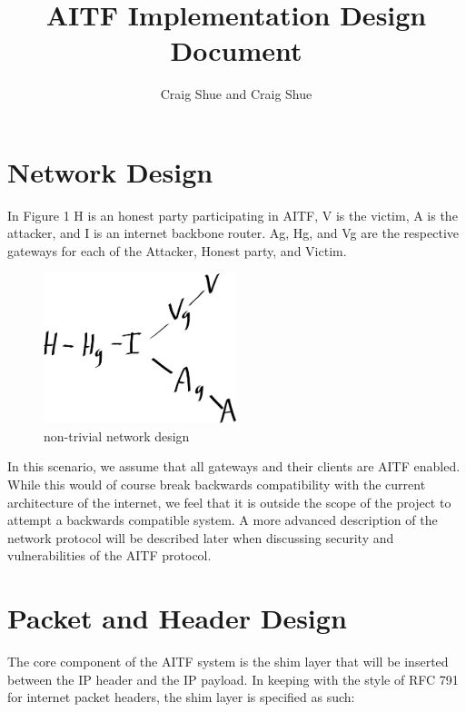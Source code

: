 \documentclass[11pt]{article}
\title{\textbf{AITF Implementation Design Document}}
\author{Craig Shue and Craig Shue}
\date{}
\begin{document}
\maketitle

\section{Network Design}

In Figure 1 H is an honest party participating in AITF, V is the victim, A is
the attacker, and I is an internet backbone router. Ag, Hg, and Vg are the
respective gateways for each of the Attacker, Honest party, and Victim. 
\begin{figure}[h!]
 \caption{non-trivial network design}
 \centering
  \includegraphics[width=0.5\textwidth]{network}
\end{figure}
In this scenario, we assume that all gateways and their clients are AITF
enabled. While this would of course break backwards compatibility with the
current architecture of the internet, we feel that it is outside the scope of
the project to attempt a backwards compatible system. A more advanced
description of the network protocol will be described later when discussing
security and vulnerabilities of the AITF protocol.

\newpage

\section{Packet and Header Design}
The core component of the AITF system is the shim layer that will be inserted
between the IP header and the IP payload. In keeping with the style of RFC 791
for internet packet headers, the shim layer is specified as such:

\texttt{}
\end{document}

